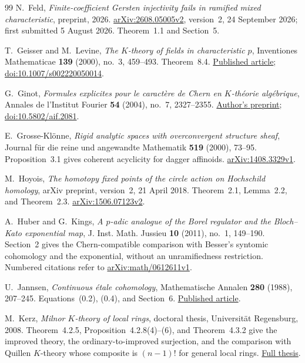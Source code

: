 \documentclass[11pt,a4paper]{amsart}
\numberwithin{equation}{section}
\theoremstyle{definition}
\theoremstyle{remark}
\begin{document}
\begin{thebibliography}{99}
N.~Feld, \emph{Finite-coefficient Gersten injectivity fails in ramified mixed
characteristic}, preprint, 2026.
\href{https://arxiv.org/abs/2608.05005v2}{arXiv:2608.05005v2},
version~2, 24 September 2026; first submitted 5 August 2026.
Theorem~1.1 and Section~5.

T.~Geisser and M.~Levine, \emph{The $K$-theory of fields in
characteristic $p$}, Inventiones Mathematicae \textbf{139}
(2000), no.~3, 459--493. Theorem~8.4.
\href{https://www2.rikkyo.ac.jp/web/geisser/p-part.pdf}{Published article};
\href{https://doi.org/10.1007/s002220050014}{doi:10.1007/s002220050014}.

G.~Ginot, \emph{Formules explicites pour le caract\`ere de Chern en $K$-th\'eorie alg\'ebrique}, Annales de l'Institut Fourier \textbf{54} (2004), no.~7, 2327--2355.
\href{https://www.math.univ-paris13.fr/~ginot/papers/flecarch.pdf}{Author's preprint};
\href{https://doi.org/10.5802/aif.2081}{doi:10.5802/aif.2081}.

E.~Grosse-Kl\"onne, \emph{Rigid analytic spaces with overconvergent structure sheaf}, Journal f\"ur die reine und angewandte Mathematik \textbf{519} (2000), 73--95. Proposition~3.1 gives coherent acyclicity for dagger affinoids.
\href{https://arxiv.org/abs/1408.3329v1}{arXiv:1408.3329v1}.

M.~Hoyois, \emph{The homotopy fixed points of the circle action on
Hochschild homology}, arXiv preprint, version~2, 21 April 2018.
Theorem~2.1, Lemma~2.2, and Theorem~2.3.
\href{https://arxiv.org/abs/1506.07123v2}{arXiv:1506.07123v2}.

A.~Huber and G.~Kings, \emph{A $p$-adic analogue of the Borel regulator and the Bloch--Kato exponential map},
J. Inst. Math. Jussieu \textbf{10} (2011), no.~1, 149--190.
Section~2 gives the Chern-compatible comparison with Besser's
syntomic cohomology and the exponential, without an unramifiedness restriction.
Numbered citations refer to
\href{https://arxiv.org/abs/math/0612611v1}{arXiv:math/0612611v1}.

U.~Jannsen, \emph{Continuous \'etale cohomology}, Mathematische Annalen \textbf{280} (1988), 207--245. Equations~(0.2), (0.4), and Section~6.
\href{https://epub.uni-regensburg.de/26684/1/jannsen12.pdf}{Published article}.

M.~Kerz, \emph{Milnor $K$-theory of local rings}, doctoral thesis, Universit\"at Regensburg, 2008. Theorem~4.2.5, Proposition~4.2.8(4)--(6), and Theorem~4.3.2 give the improved theory, the ordinary-to-improved surjection, and the comparison with Quillen $K$-theory whose composite is $(n-1)!$ for general local rings.
\href{https://d-nb.info/98935329x/34}{Full thesis}.


\end{thebibliography}
\end{document}
